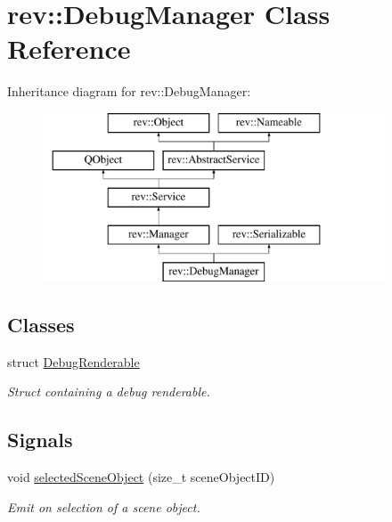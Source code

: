 \hypertarget{classrev_1_1_debug_manager}{}\section{rev\+::Debug\+Manager Class Reference}
\label{classrev_1_1_debug_manager}
Inheritance diagram for rev\+::Debug\+Manager\+:\begin{figure}[H]
\begin{center}
\leavevmode
\includegraphics[height=5.000000cm]{classrev_1_1_debug_manager}
\end{center}
\end{figure}
\subsection*{Classes}
\begin{DoxyCompactItemize}
\item 
struct \mbox{\hyperlink{structrev_1_1_debug_manager_1_1_debug_renderable}{Debug\+Renderable}}
\begin{DoxyCompactList}\small\item\em Struct containing a debug renderable. \end{DoxyCompactList}\end{DoxyCompactItemize}
\subsection*{Signals}
\begin{DoxyCompactItemize}
\item 
\mbox{\label{classrev_1_1_debug_manager_aaccae7629cefb73032f711757ea6c656}} 
void \mbox{\hyperlink{classrev_1_1_debug_manager_aaccae7629cefb73032f711757ea6c656}{selected\+Scene\+Object}} (size\+\_\+t scene\+Object\+ID)
\begin{DoxyCompactList}\small\item\em Emit on selection of a scene object. \end{DoxyCompactList}\end{DoxyCompactItemize}
